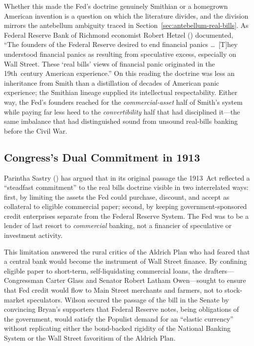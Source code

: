 \documentclass[12pt]{article}
\begin{document}
Whether this made the Fed's doctrine genuinely Smithian or a homegrown American
invention is a question on which the literature divides, and the division mirrors
the antebellum ambiguity traced in Section~\ref{sec:antebellum-real-bills}.  As
Federal Reserve Bank of Richmond economist Robert Hetzel (\citeyear{hetzel2014})
documented, ``The founders of the Federal Reserve desired to end financial panics
\ldots\ [T]hey understood financial panics as resulting from speculative excess,
especially on Wall Street.  These `real bills' views of financial panic originated
in the 19th~century American experience.''  On this reading the doctrine was less
an inheritance from Smith than a distillation of decades of American panic
experience; the Smithian lineage supplied its intellectual respectability.  Either
way, the Fed's founders reached for the \emph{commercial-asset} half of Smith's
system while paying far less heed to the \emph{convertibility} half that had
disciplined it---the same imbalance that had distinguished sound from unsound
real-bills banking before the Civil War.

\subsection{Congress's Dual Commitment in 1913}

Parintha Sastry (\citeyear{sastry2018}) has argued that in its original passage the
1913~Act reflected a ``steadfast commitment'' to the real bills doctrine visible in
two interrelated ways: first, by limiting the assets the Fed could purchase, discount,
and accept as collateral to eligible commercial paper; second, by keeping
government-sponsored credit enterprises separate from the Federal Reserve System.
The Fed was to be a lender of last resort to \emph{commercial} banking, not a
financier of speculative or investment activity.

This limitation answered the rural critics of the Aldrich Plan who had feared that
a central bank would become the instrument of Wall Street finance.  By
confining eligible paper to short-term, self-liquidating commercial loans, the
drafters---Congressman Carter Glass and Senator Robert Latham Owen---sought to
ensure that Fed credit would flow to Main Street merchants and farmers, not to
stock-market speculators.  Wilson secured the passage of the bill in the Senate by
convincing Bryan's supporters that Federal Reserve notes, being obligations of the
government, would satisfy the Populist demand for an ``elastic currency'' without
replicating either the bond-backed rigidity of the National Banking System or the
Wall Street favoritism of the Aldrich Plan.
\end{document}
